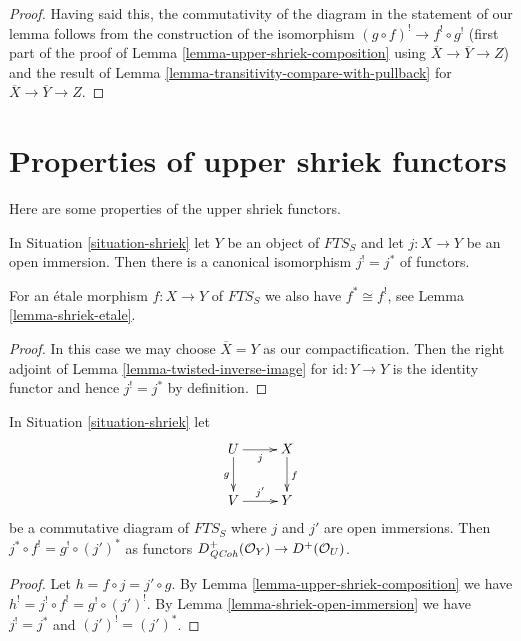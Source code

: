 \begin{proof}
\medskip\noindent
Having said this, the commutativity of the diagram in the statement
of our lemma follows from the construction of the isomorphism
$(g \circ f)^! \to f^! \circ g^!$ (first part of the proof of
Lemma \ref{lemma-upper-shriek-composition} using
$\overline{X} \to \overline{Y} \to Z$) and the result
of Lemma \ref{lemma-transitivity-compare-with-pullback}
for $\overline{X} \to \overline{Y} \to Z$.
\end{proof}



\section{Properties of upper shriek functors}
\label{section-upper-shriek-properties}

\noindent
Here are some properties of the upper shriek functors.

\begin{lemma}
\label{lemma-shriek-open-immersion}
In Situation \ref{situation-shriek} let $Y$ be an object
of $\textit{FTS}_S$ and let $j : X \to Y$ be an open immersion.
Then there is a canonical isomorphism $j^! = j^*$ of functors.
\end{lemma}

\noindent
For an \'etale morphism $f : X \to Y$ of $\textit{FTS}_S$
we also have $f^* \cong f^!$, see Lemma \ref{lemma-shriek-etale}.

\begin{proof}
In this case we may choose $\overline{X} = Y$ as our compactification.
Then the
right adjoint of Lemma \ref{lemma-twisted-inverse-image} for
$\text{id} : Y \to Y$ is the
identity functor and hence $j^! = j^*$ by definition.
\end{proof}

\begin{lemma}
\label{lemma-restrict-before-or-after}
In Situation \ref{situation-shriek} let
$$
\xymatrix{
U \ar[r]_j \ar[d]_g & X \ar[d]^f \\
V \ar[r]^{j'} & Y
}
$$
be a commutative diagram of $\textit{FTS}_S$ where $j$ and $j'$ are
open immersions. Then $j^* \circ f^! = g^! \circ (j')^*$ as functors
$D^+_{\mathit{QCoh}}(\mathcal{O}_Y) \to D^+(\mathcal{O}_U)$.
\end{lemma}

\begin{proof}
Let $h = f \circ j = j' \circ g$. By
Lemma \ref{lemma-upper-shriek-composition} we have
$h^! = j^! \circ f^! = g^! \circ (j')^!$. By
Lemma \ref{lemma-shriek-open-immersion}
we have $j^! = j^*$ and $(j')^! = (j')^*$.
\end{proof}

